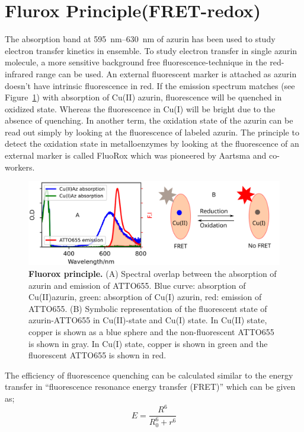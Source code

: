 \section{Flurox Principle(FRET-redox)}
The absorption band at \SIrange{595}{630}{\nm} of azurin has been used to study electron transfer kinetics in ensemble.
To study electron transfer in single azurin molecule, a more sensitive background free fluorescence-technique in the red-infrared range can be used.
An external fluorescent marker is attached as azurin doesn't have intrinsic fluorescence in red.
If the emission spectrum matches (see Figure~\ref{fig:flurox_azurin}) with absorption of Cu(II) azurin, fluorescence will be quenched in oxidized state.
Whereas the fluorescence in Cu(I) will be bright due to the absence of quenching.
In another term, the oxidation state of the azurin can be read out simply by looking at the fluorescence of labeled azurin.
The principle to detect the oxidation state in metalloenzymes by looking at the fluorescence of an external marker is called FluoRox which was pioneered by Aartsma and co-workers.\cite{kuznetsova2008the,goldsmith2011redox,tabares2011fluorescence}
\begin{figure}
	\centering
	\includegraphics[width=\textwidth]{flurox_azurin}
	\caption{\textbf{Fluorox principle.} (A) Spectral overlap between the absorption of azurin and emission of ATTO655. Blue curve: absorption of Cu(II)azurin, green: absorption of Cu(I) azurin, red: emission of ATTO655.
	(B) Symbolic representation of the fluorescent state of azurin-ATTO655 in Cu(II)-state and Cu(I) state. In Cu(II) state, copper is shown as a blue sphere and the non-fluorescent ATTO655 is shown in gray. In Cu(I) state, copper is shown in green and the fluorescent ATTO655 is shown in red.}
	\label{fig:flurox_azurin}
\end{figure}
The efficiency of fluorescence quenching can be calculated similar to the energy transfer in ``fluorescence resonance energy transfer (FRET)'' which can be given as;
\begin{equation}
	E = \frac{R^6}{R_0^6 + r^6}	
\end{equation}
